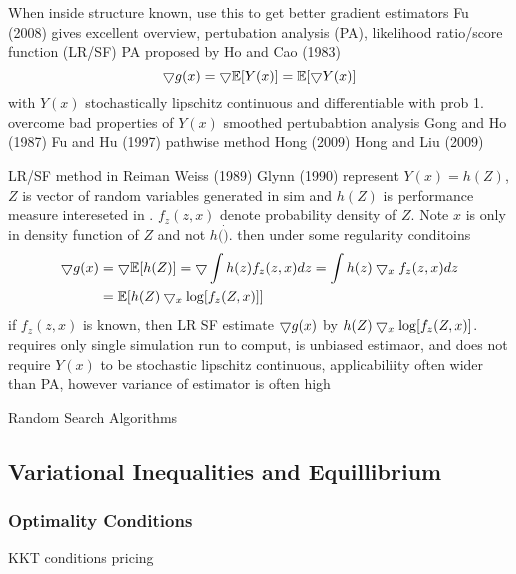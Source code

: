 When inside structure known, use this to get better gradient estimators
Fu (2008) gives excellent overview, pertubation analysis (PA), likelihood ratio/score function (LR/SF)
PA proposed by Ho and Cao (1983)
\begin{equation}
\bigtriangledown g(x) = \bigtriangledown \mathbb{E} [ Y(x) ] = \mathbb{E} [ \bigtriangledown Y (x) ] 
\end{equation}
with $Y(x)$ stochastically lipschitz continuous and differentiable with prob 1.
overcome bad properties of $Y(x)$
smoothed pertubabtion analysis Gong and Ho (1987) Fu and Hu (1997)
pathwise method Hong (2009) Hong and Liu (2009)

LR/SF method in Reiman Weiss (1989) Glynn (1990)
represent $Y(x) = h(Z)$, $Z$ is vector of random variables generated in sim and $h(Z)$ is performance measure intereseted in .  $f_z(z,x)$ denote probability density of $Z$.  Note $x$ is only in density function of $Z$ and not $h(\dot)$.
then under some regularity conditoins
\begin{align}
\bigtriangledown g(x) &= \bigtriangledown \mathbb{E} [ h(Z) ] = \bigtriangledown \int h(z) f_z(z,x) dz = \int h(z) \bigtriangledown_x f_z(z,x) dz \\
	&= \mathbb{E} [ h(Z) \bigtriangledown_x \log [ f_z(Z,x) ] ]
\end{align}
if $f_z(z,x)$ is known, then LR SF estimate $\bigtriangledown g(x)$ by $h(Z) \bigtriangledown_x \log [ f_z(Z,x) ]$. requires only single simulation run to comput, is unbiased estimaor, and does not require $Y(x)$ to be stochastic lipschitz continuous, applicabiliity often wider than PA, however variance of estimator is often high

Random Search Algorithms




\subsection{Variational Inequalities and Equillibrium}



\subsubsection{Optimality Conditions}
KKT conditions
pricing
